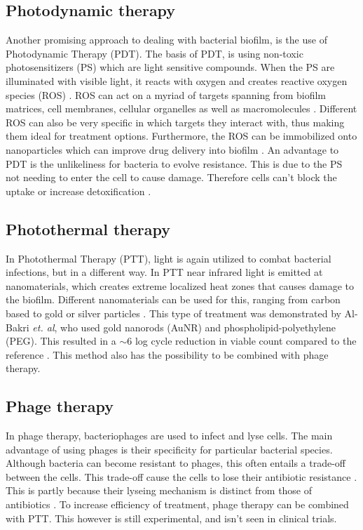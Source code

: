 \subsection{Photodynamic therapy}
Another promising approach to dealing with bacterial biofilm, is the use of Photodynamic Therapy (PDT). The basis of PDT, is using non-toxic photosensitizers (PS) which are light sensitive compounds. When the PS are illuminated with visible light, it reacts with oxygen and creates reactive oxygen species (ROS) \cite{Darabpour2016ChitosanStudy}. ROS can act on a myriad of targets spanning from biofilm matrices, cell membranes, cellular organelles as well as macromolecules \cite{Darabpour2016ChitosanStudy}. Different ROS can also be very specific in which targets they interact with, thus making them ideal for treatment options. Furthermore, the ROS can be immobilized onto nanoparticles which can improve drug delivery into biofilm \cite{Darabpour2016ChitosanStudy}. An advantage to PDT is the unlikeliness for bacteria to evolve resistance. This is due to the PS not needing to enter the cell to cause damage. Therefore cells can't block the uptake or increase detoxification \cite{Tavares2010AntimicrobialTreatment}.

\subsection{Photothermal therapy}           
In Photothermal Therapy (PTT), light is again utilized to combat bacterial infections, but in a different way. In PTT near infrared light is emitted at nanomaterials, which creates extreme localized heat zones that causes damage to the biofilm. Different nanomaterials can be used for this, ranging from carbon based to gold or silver particles \cite{Korupalli2017Acidity-triggeredInfection}. This type of treatment was demonstrated by Al-Bakri \emph{et. al}, who used gold nanorods (AuNR) and phospholipid-polyethylene (PEG). This resulted in a $\sim$6 log cycle reduction in viable count compared to the reference \cite{Al-Bakri2019Photothermal-inducedBiofilm}. This method also has the possibility to be combined with phage therapy.

\subsection{Phage therapy}
In phage therapy, bacteriophages are used to infect and lyse cells. The main advantage of using phages is their specificity for particular bacterial species. Although bacteria can become resistant to phages, this often entails  a trade-off between the cells. This trade-off cause the cells to lose their antibiotic resistance \cite{Chan2018PhageAeruginosa}. This is partly because their lyseing mechanism is distinct from those of antibiotics \cite{Chan2018PhageAeruginosa}. To increase efficiency of treatment, phage therapy can be combined with PTT. This however is still experimental, and isn't seen in clinical trials. 


